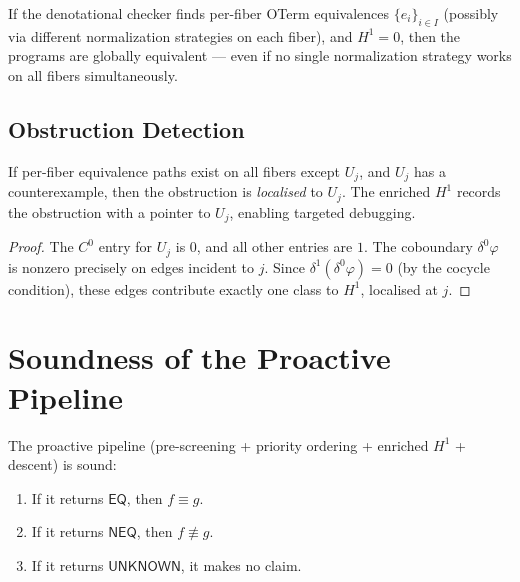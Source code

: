 \begin{corollary}
If the denotational checker finds per-fiber OTerm equivalences
$\{e_i\}_{i \in I}$ (possibly via different normalization strategies
on each fiber), and $H^1 = 0$, then the programs are globally
equivalent --- even if no single normalization strategy works on
all fibers simultaneously.
\end{corollary}

\subsection{Obstruction Detection}

\begin{theorem}
\label{thm:descent-obstruction}
If per-fiber equivalence paths exist on all fibers except $U_j$,
and $U_j$ has a counterexample, then the obstruction is
\emph{localised} to $U_j$.  The enriched $H^1$ records the
obstruction with a pointer to $U_j$, enabling targeted debugging.
\end{theorem}

\begin{proof}
The $C^0$ entry for $U_j$ is $0$, and all other entries are $1$.
The coboundary $\delta^0\varphi$ is nonzero precisely on edges
incident to $j$.  Since $\delta^1(\delta^0\varphi) = 0$ (by the
cocycle condition), these edges contribute exactly one class to
$H^1$, localised at $j$.
\end{proof}


\section{Soundness of the Proactive Pipeline}
\label{sec:soundness}

\begin{theorem}
\label{thm:proactive-soundness}
The proactive pipeline (pre-screening + priority ordering +
enriched $H^1$ + descent) is sound:
\begin{enumerate}
  \item If it returns $\mathsf{EQ}$, then $f \equiv g$.
  \item If it returns $\mathsf{NEQ}$, then $f \not\equiv g$.
  \item If it returns $\mathsf{UNKNOWN}$, it makes no claim.
\end{enumerate}
\end{theorem}

